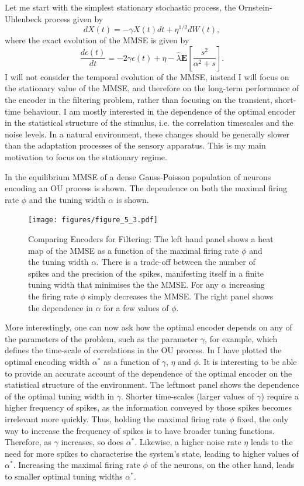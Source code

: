 Let me start with the simplest stationary stochastic process, the Ornstein-Uhlenbeck process
given by
\[
dX(t) = -\gamma X(t) dt + \eta^{1/2} dW(t),
\]
where the exact evolution of the MMSE is given by
\[
\frac{d\epsilon(t)}{dt} = -2\gamma \epsilon(t) + \eta -\hat{\lambda} \boldsymbol{E}\left[\frac{s^2}{\alpha^2+s}\right].
\]
I will not consider the temporal evolution of the MMSE, instead
I will focus on the stationary value of the MMSE, and therefore on the long-term performance of the encoder in the filtering problem, rather than focusing
on the transient, short-time behaviour. I am mostly interested in the dependence of the optimal encoder in the statistical structure of the stimulus, i.e. the correlation
timescales and the noise levels. In a natural environment, these changes should be generally slower than the adaptation processes of the sensory apparatus. This is my main
motivation to focus on the stationary regime.\par
In  the equilibrium MMSE of a dense Gauss-Poisson population of neurons encoding
an OU process is shown. The dependence on both the maximal firing rate $\phi$ and the tuning width $\alpha$ is shown.

\begin{figure}
\label{fig:mmse_ou}
\texttt{[image: figures/figure\_5\_3.pdf]}
\caption[Optimal encoding for the OU process.]{Comparing Encoders for Filtering: The left hand panel shows a heat map of the MMSE as a function of the maximal firing rate $\phi$ and the tuning
width $\alpha$. There is a trade-off between the number of spikes and the precision of the spikes, manifesting itself in a finite tuning width that minimises the
the MMSE. For any $\alpha$ increasing the firing rate $\phi$ simply decreases the MMSE. The right panel shows the dependence in $\alpha$ for a few values
of $\phi$.}
\end{figure}

More interestingly, one can now ask how the optimal encoder depends on any of the parameters of the problem, such as the parameter $\gamma$, for example,
which defines the time-scale of correlations in the OU process.\footnotemark
In  I have plotted the optimal encoding width $\alpha^*$ as a function of $\gamma$, $\eta$ and
$\phi$. It is interesting to be able to provide an accurate account of the dependence of the optimal 
encoder on the statistical structure of the environment. The leftmost panel shows the dependence of the optimal tuning width in $\gamma$. Shorter time-scales (larger values of $\gamma$) require a higher frequency of spikes, as the information conveyed by those spikes becomes irrelevant
more quickly. Thus, holding the maximal firing rate $\phi$ fixed, the only way to increase the frequency of spikes is to have broader tuning functions. Therefore, as $\gamma$
increases, so does $\alpha^*$. Likewise, a higher noise rate $\eta$ leads to the need for more spikes to characterise the system's state, leading to higher values
of $\alpha^*$. Increasing the maximal firing rate $\phi$ of the neurons, on the other hand, leads to smaller optimal tuning widths $\alpha^*$.


